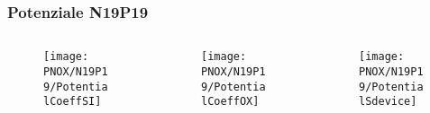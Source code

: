 \begin{frame}
\frametitle{Potenziale N19P19}
\begin{columns}

\begin{column}{0.3 \textwidth}
\begin{center}
\begin{figure}[!h]
          {\texttt{[image: PNOX/N19P19/PotentialCoeffSI]}}
          \end{figure}
\end{center}
\end{column}

\begin{column}{0.3 \textwidth}
\begin{center}
\begin{figure}[!h]
          {\texttt{[image: PNOX/N19P19/PotentialCoeffOX]}}
\end{figure}
\end{center}
\end{column}

\begin{column}{0.3 \textwidth}
\begin{center}
\begin{figure}[!h]
          {\texttt{[image: PNOX/N19P19/PotentialSdevice]}}
\end{figure}
\end{center}
\end{column}

\end{columns}

\end{frame}

